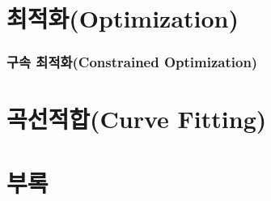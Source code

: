 \documentclass{article}
\numberwithin{equation}{section}
\numberwithin{figure}{section}
\numberwithin{algorithm}{section}
\theoremstyle{examplestyle}
\let\\\tabularnewline
\let\\\tabularnewline
\begin{document}
\clearpage
\part{최적화\\(Optimization)}
%

\section{구속 최적화\\(Constrained Optimization)}


\clearpage
\part{곡선적합\\(Curve Fitting)}


\clearpage
\part{부록}
\begin{appendices}

%
% 
% 
% 
% 
% 
%
%
%
%
\end{appendices}
\end{document}
